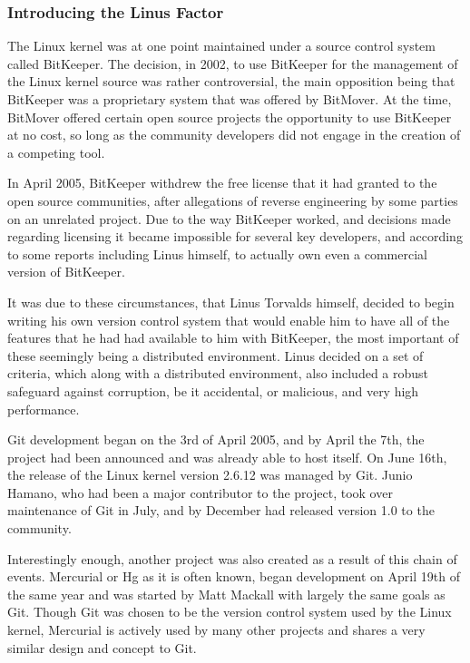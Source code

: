 \subsubsection{Introducing the Linus Factor}
The Linux kernel was at one point maintained under a source control system called BitKeeper.
The decision, in 2002, to use BitKeeper for the management of the Linux kernel source was rather controversial, the main opposition being that BitKeeper was a proprietary system that was offered by BitMover.
At the time, BitMover offered certain open source projects the opportunity to use BitKeeper at no cost, so long as the community developers did not engage in the creation of a competing tool.

In April 2005, BitKeeper withdrew the free license that it had granted to the open source communities, after allegations of reverse engineering by some parties on an unrelated project.
Due to the way BitKeeper worked, and decisions made regarding licensing it became impossible for several key developers, and according to some reports including Linus himself, to actually own even a commercial version of BitKeeper.

It was due to these circumstances, that Linus Torvalds himself, decided to begin writing his own version control system that would enable him to have all of the features that he had had available to him with BitKeeper, the most important of these seemingly being a distributed environment.
Linus decided on a set of criteria, which along with a distributed environment, also included a robust safeguard against corruption, be it accidental, or malicious, and very high performance.

Git development began on the 3rd of April 2005, and by April the 7th, the project had been announced and was already able to host itself.
On June 16th, the release of the Linux kernel version 2.6.12 was managed by Git.
Junio Hamano, who had been a major contributor to the project, took over maintenance of Git in July, and by December had released version 1.0 to the community.

Interestingly enough, another project was also created as a result of this chain of events.
Mercurial or Hg as it is often known, began development on April 19th of the same year and was started by Matt Mackall with largely the same goals as Git.
Though Git was chosen to be the version control system used by the Linux kernel, Mercurial is actively used by many other projects and shares a very similar design and concept to Git.

